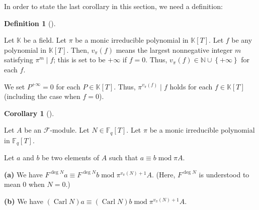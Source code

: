 \documentclass[numbers=enddot,12pt,final,onecolumn,notitlepage]{scrartcl}%
\theoremstyle{definition}
\newtheorem{defi}[theo]{Definition}
\newenvironment{definition}[1][]
{\begin{defi}[#1]\begin{leftbar}}
{\end{leftbar}\end{defi}}
\newtheorem{coro}[theo]{Corollary}
\newenvironment{corollary}[1][]
{\begin{coro}[#1]\begin{leftbar}}
{\end{leftbar}\end{coro}}
\begin{document}
In order to state the last corollary in this section, we need a definition:

\begin{definition}
\label{def.vpi}Let $\mathbb{K}$ be a field. Let $\pi$ be a monic irreducible
polynomial in $\mathbb{K}\left[  T\right]  $. Let $f$ be any polynomial in
$\mathbb{K}\left[  T\right]  $. Then, $v_{\pi}\left(  f\right)  $ means the
largest nonnegative integer $m$ satisfying $\pi^{m}\mid f$; this is set to be
$+\infty$ if $f=0$. Thus, $v_{\pi}\left(  f\right)  \in\mathbb{N}\cup\left\{
+\infty\right\}  $ for each $f$.

We set $P^{+\infty}=0$ for each $P\in\mathbb{K}\left[  T\right]  $. Thus,
$\pi^{v_{\pi}\left(  f\right)  }\mid f$ holds for each $f\in\mathbb{K}\left[
T\right]  $ (including the case when $f=0$).
\end{definition}

\begin{corollary}
\label{cor.F.lift.lift-all}Let $A$ be an $\mathcal{F}$-module. Let
$N\in\mathbb{F}_{q}\left[  T\right]  $. Let $\pi$ be a monic irreducible
polynomial in $\mathbb{F}_{q}\left[  T\right]  $.

Let $a$ and $b$ be two elements of $A$ such that $a\equiv b\operatorname{mod}%
\pi A$.

\textbf{(a)} We have $F^{\deg N}a\equiv F^{\deg N}b\operatorname{mod}%
\pi^{v_{\pi}\left(  N\right)  +1}A$. (Here, $F^{\deg N}$ is understood to mean
$0$ when $N=0$.)

\textbf{(b)} We have $\left(  \operatorname*{Carl}N\right)  a\equiv\left(
\operatorname*{Carl}N\right)  b\operatorname{mod}\pi^{v_{\pi}\left(  N\right)
+1}A$.
\end{corollary}
\end{document}
